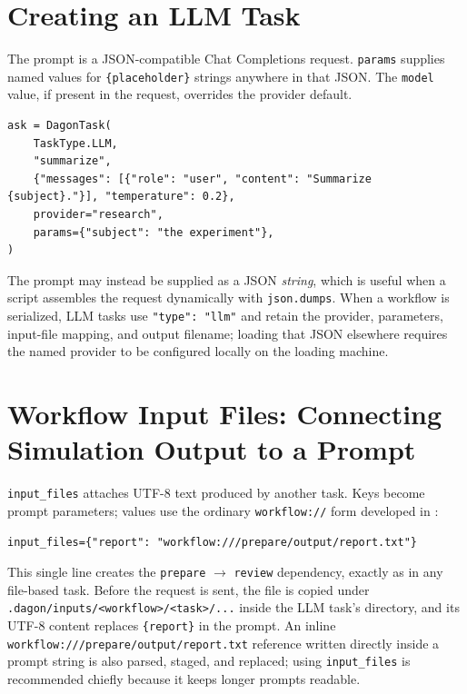 \section{Creating an LLM Task}

The prompt is a JSON-compatible Chat Completions request. \texttt{params}
supplies named values for \texttt{\{placeholder\}} strings anywhere in that
JSON. The \texttt{model} value, if present in the request, overrides the
provider default.

\begin{lstlisting}[caption={Minimal LLM task construction.}]
ask = DagonTask(
    TaskType.LLM,
    "summarize",
    {"messages": [{"role": "user", "content": "Summarize {subject}."}], "temperature": 0.2},
    provider="research",
    params={"subject": "the experiment"},
)
\end{lstlisting}

The prompt may instead be supplied as a JSON \emph{string}, which is useful
when a script assembles the request dynamically with \texttt{json.dumps}.
When a workflow is serialized, LLM tasks use \texttt{"type": "llm"} and
retain the provider, parameters, input-file mapping, and output filename;
loading that JSON elsewhere requires the named provider to be configured
locally on the loading machine.

\section{Workflow Input Files: Connecting Simulation Output to a Prompt}
\label{sec:llm-input-files}

\texttt{input\_files} attaches UTF-8 text produced by another task. Keys
become prompt parameters; values use the ordinary \texttt{workflow://} form
developed in :

\begin{lstlisting}
input_files={"report": "workflow:///prepare/output/report.txt"}
\end{lstlisting}

This single line creates the \texttt{prepare} $\to$ \texttt{review}
dependency, exactly as in any file-based task. Before the request is sent,
the file is copied under
\texttt{.dagon/inputs/<workflow>/<task>/...} inside the LLM task's
directory, and its UTF-8 content replaces \texttt{\{report\}} in the prompt.
An inline \texttt{workflow:///prepare/output/report.txt} reference written
directly inside a prompt string is also parsed, staged, and replaced; using
\texttt{input\_files} is recommended chiefly because it keeps longer prompts
readable.

